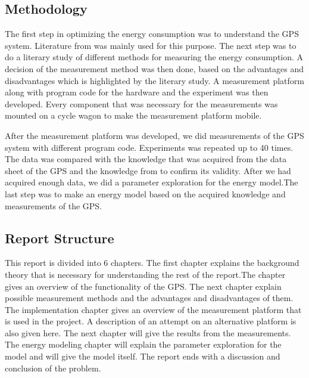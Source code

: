 \subsection{Methodology}


The first step in optimizing the energy consumption was to understand the GPS system. Literature from  \cite{GPS} was mainly used for this purpose. The next step was to do a literary study of different methods for measuring the energy consumption. 
A decision of the measurement method was then done, based on the advantages and disadvantages which is highlighted by the literary study. A measurement platform along with program code for the hardware and the experiment was then developed. Every component that was necessary for the measurements was mounted on a cycle wagon to make the measurement platform mobile. 

After the measurement platform was developed, we did measurements of the GPS system with different program code. Experiments was repeated up to 40 times. The data was compared with the knowledge that was acquired from the data sheet of the GPS and the knowledge from \cite{GPS} to confirm its validity. After we had acquired enough data, we did a parameter exploration for the energy model.The last step was to make an energy model based on the acquired knowledge and measurements of the GPS. 



\subsection{Report Structure}

This report is divided into 6 chapters. The first chapter explains the background theory that is necessary for understanding the rest of the report.The chapter gives an overview of the functionality of the GPS. The next chapter explain possible measurement methods and the advantages and disadvantages of them. The implementation chapter gives an overview of the measurement platform that is used in the project. A description of an attempt on an alternative platform is also given here. The next chapter will give the results from the measurements. The energy modeling chapter will explain the parameter exploration for the model and will give the model itself. The report ends with a discussion and conclusion of the problem. 


\newpage